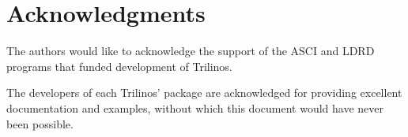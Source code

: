\documentclass[12pt,relax]{SANDreport}
\begin{document}
\clearpage
\section*{Acknowledgments}
The authors would like to acknowledge the support of the ASCI and LDRD programs
that funded development of Trilinos.

\medskip

The developers of each Trilinos' package are acknowledged for providing
excellent documentation and examples, without which this document would
have never been possible.


\clearpage

\SANDmain

\tableofcontents

\clearpage



\clearpage
\newpage


\clearpage
\newpage


\clearpage
\newpage


\clearpage
\newpage


\clearpage
\newpage


\clearpage
\newpage


\clearpage
\newpage


\clearpage
\newpage


\clearpage
\newpage


\clearpage
\newpage


\clearpage
\newpage


\clearpage
\newpage




\end{document}
